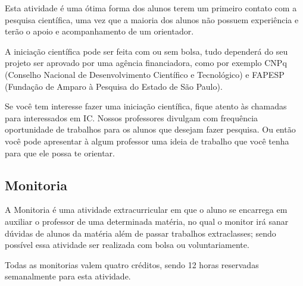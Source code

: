 Esta atividade é uma ótima forma dos alunos terem um primeiro contato com a pesquisa científica, uma vez que a maioria dos alunos não possuem experiência e terão o apoio e acompanhamento de um orientador.

A iniciação científica pode ser feita com ou sem bolsa, tudo dependerá do seu projeto ser aprovado por uma agência financiadora,  como por exemplo CNPq (Conselho Nacional de Desenvolvimento Científico e Tecnológico) e FAPESP (Fundação de Amparo à Pesquisa do Estado de São Paulo). 

Se você tem interesse fazer uma iniciação científica, fique atento às chamadas para interessados em IC. Nossos professores divulgam com frequência oportunidade de trabalhos para os alunos que desejam fazer pesquisa. Ou então você pode apresentar à algum professor uma ideia de trabalho que você tenha para que ele possa te orientar.

\subsection{Monitoria}
A Monitoria é uma atividade extracurricular em que o aluno se encarrega em auxiliar o professor de uma determinada matéria, no qual o monitor irá sanar dúvidas de alunos da matéria além de passar trabalhos extraclasses; sendo possível essa atividade ser realizada com bolsa ou voluntariamente.

Todas as monitorias valem quatro créditos, sendo 12 horas reservadas semanalmente para esta atividade.
